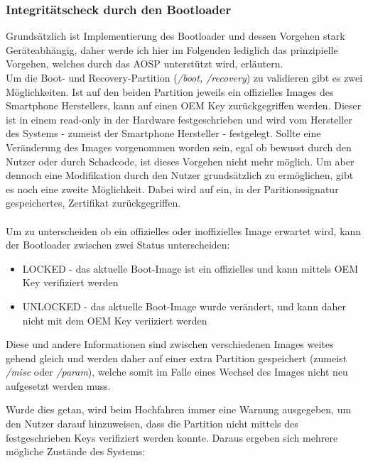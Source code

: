 	\subsubsection{Integritätscheck durch den Bootloader}
	Grundsätzlich ist Implementierung des Bootloader und dessen Vorgehen stark Geräteabhängig, daher werde ich hier im Folgenden lediglich das prinzipielle Vorgehen, welches durch das AOSP unterstützt wird, erläutern.\\
	Um die Boot- und Recovery-Partition (\textit{/boot, /recovery}) zu validieren gibt es zwei Möglichkeiten. Ist auf den beiden Partition jeweils ein offizielles Images des Smartphone Herstellers, kann auf einen OEM Key zurückgegriffen werden. Dieser ist in einem read-only in der Hardware festgeschrieben und wird vom Hersteller des Systems - zumeist der Smartphone Hersteller - festgelegt. Sollte eine Veränderung des Images vorgenommen worden sein, egal ob bewusst durch den Nutzer oder durch Schadcode, ist dieses Vorgehen nicht mehr möglich. Um aber dennoch eine Modifikation durch den Nutzer grundsätzlich zu ermöglichen, gibt es noch eine zweite Möglichkeit. Dabei wird auf ein, in der Paritionssignatur gespeichertes, Zertifikat zurückgegriffen.\\\\
	Um zu unterscheiden ob ein offizielles oder inoffizielles Image erwartet wird, kann der Bootloader zwischen zwei Status unterscheiden:\\
	
	\begin{itemize}\itemsep0pt
		\item LOCKED - das aktuelle Boot-Image ist ein offizielles und kann mittels OEM Key verifiziert werden
		\item UNLOCKED - das aktuelle Boot-Image wurde verändert, und kann daher nicht mit dem OEM Key veriiziert werden
	\end{itemize}
	
\begin{flushleft}
	Diese und andere Informationen sind zwischen verschiedenen Images weites gehend gleich und werden daher auf einer extra Partition gespeichert (zumeist \textit{/misc} oder \textit{/param}), welche somit im Falle eines Wechsel des Images nicht neu aufgesetzt werden muss.
\end{flushleft}
	 Wurde dies getan, wird beim Hochfahren immer eine Warnung ausgegeben, um den Nutzer darauf hinzuweisen, dass die Partition nicht mittels des festgeschrieben Keys verifiziert werden konnte. Daraus ergeben sich mehrere mögliche Zustände des Systems:\\\\
	
